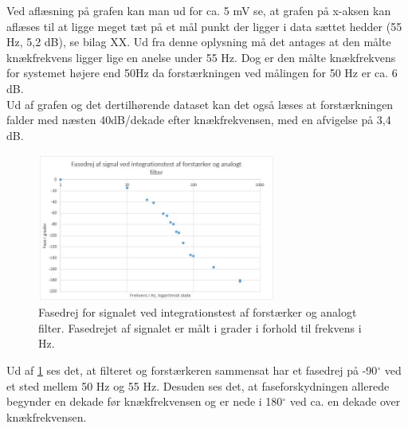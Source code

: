Ved aflæsning på grafen kan man ud for ca. 5 mV se, at grafen på x-aksen kan aflæses til at ligge meget tæt på et mål punkt der ligger i data sættet hedder (55 Hz, 5,2 dB), se bilag XX. Ud fra denne oplysning må det antages at den målte knækfrekvens ligger lige en anelse under 55 Hz. Dog er den målte knækfrekvens for systemet højere end 50Hz da forstærkningen ved målingen for 50 Hz er ca. 6 dB.\\
Ud af grafen og det dertilhørende dataset kan det også læses at forstærkningen falder med næsten 40dB/dekade efter knækfrekvensen, med en afvigelse på 3,4 dB.\\
\begin{figure}[H]
	\centering
	\includegraphics[width=0.7\textwidth]{Figurer/Hardware/FaseForstaerkerFilter}
	\caption{Fasedrej for signalet ved integrationstest af forstærker og analogt filter. Fasedrejet af signalet er målt i grader i forhold til frekvens i Hz.}
	\label{fig:FaseForstaerkerFilter}
\end{figure}
Ud af \ref{fig:FaseForstaerkerFilter} ses det, at filteret og forstærkeren sammensat har et fasedrej på -90$^{\circ}$ ved et sted mellem 50 Hz og 55 Hz. Desuden ses det, at faseforskydningen allerede begynder en dekade før knækfrekvensen og er nede i 180$^{\circ}$ ved ca. en dekade over knækfrekvensen.

